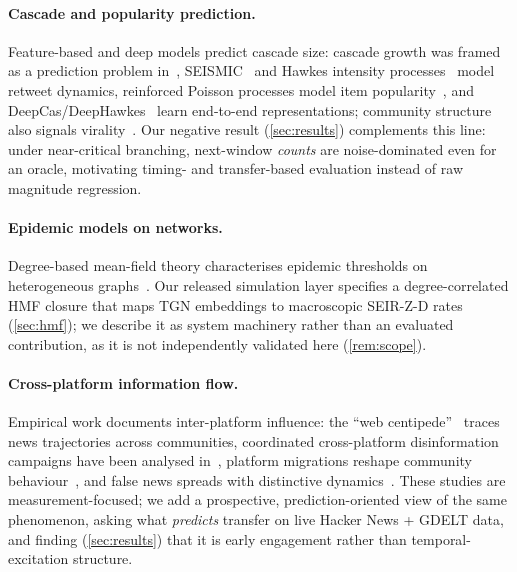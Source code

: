 \documentclass[11pt]{article}
\begin{document}
\paragraph{Cascade and popularity prediction.}
Feature-based and deep models predict cascade size: cascade growth was framed
as a prediction problem in~\citep{cheng2014cascades},
SEISMIC~\citep{zhao2015seismic} and Hawkes intensity
processes~\citep{rizoiu2017hip,kobayashi2016tideh} model retweet dynamics,
reinforced Poisson processes model item popularity~\citep{shen2014rpp}, and
DeepCas/DeepHawkes~\citep{li2017deepcas,cao2017deephawkes} learn end-to-end
representations; community structure also signals virality~\citep{weng2013virality}.
Our negative result (\cref{sec:results}) complements this line: under
near-critical branching, next-window \emph{counts} are noise-dominated even for
an oracle, motivating timing- and transfer-based evaluation instead of raw
magnitude regression.

\paragraph{Epidemic models on networks.}
Degree-based mean-field theory characterises epidemic thresholds on
heterogeneous graphs~\citep{pastor2001epidemic,boguna2002correlated,pastor2015epidemic}.
Our released simulation layer specifies a degree-correlated HMF closure that
maps TGN embeddings to macroscopic SEIR-Z-D rates (\cref{sec:hmf}); we describe
it as system machinery rather than an evaluated contribution, as it is not
independently validated here (\cref{rem:scope}).

\paragraph{Cross-platform information flow.}
Empirical work documents inter-platform influence: the ``web
centipede''~\citep{zannettou2017webcentipede} traces news trajectories across
communities, coordinated cross-platform disinformation campaigns have been
analysed in~\citep{wilson2020crossplatform}, platform migrations reshape community
behaviour~\citep{horta2021migrations}, and false news spreads with distinctive
dynamics~\citep{vosoughi2018spread}. These studies are measurement-focused; we
add a prospective, prediction-oriented view of the same phenomenon, asking what
\emph{predicts} transfer on live Hacker News + GDELT data, and finding
(\cref{sec:results}) that it is early engagement rather than temporal-excitation
structure.
\end{document}
